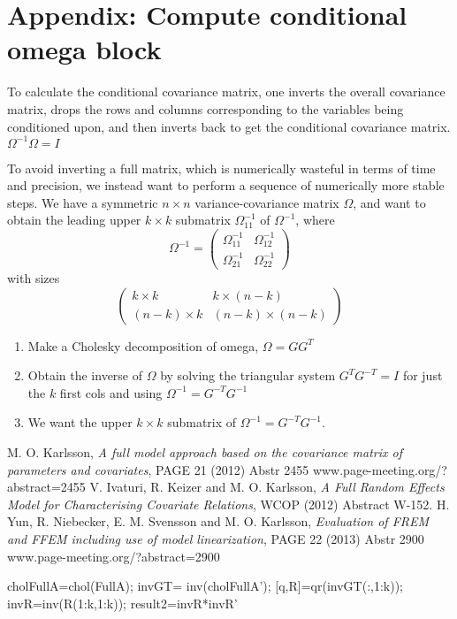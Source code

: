 \section{Appendix: Compute conditional omega block}
To calculate the conditional covariance matrix, 
one inverts the overall covariance matrix, 
drops the rows and columns corresponding to the variables being conditioned upon, and then inverts back to get the conditional covariance matrix.
\begin{math}
\Omega^{-1}\Omega = I
\end{math}

To avoid inverting a full matrix, which is numerically wasteful in terms of time and precision, we instead want to perform a sequence of numerically more stable steps.
We have a symmetric $n\times n$ variance-covariance matrix $\Omega$, and want to obtain the leading upper $k\times k$ submatrix $\Omega^{-1}_{11}$
of $\Omega^{-1}$, where
\[
\Omega^{-1} = \left( \begin{array}{cc}
\Omega^{-1}_{11} & \Omega^{-1}_{12}\\
\Omega^{-1}_{21} & \Omega^{-1}_{22} 
\end{array} \right)
\] with sizes \[
\left(
\begin{array}{cc}
k\times k & k\times (n-k)\\
(n-k)\times k & (n-k)\times (n-k) 
\end{array}
\right)
\] 
\begin{enumerate}
\item Make a Cholesky decomposition of omega, $\Omega=GG^T$
\item Obtain the inverse of $\Omega$ by solving the triangular system $G^{T}G^{-T}=I$ for just the $k$ first cols and using $\Omega^{-1}=G^{-T}G^{-1}$
\item We want the upper $k\times k$ submatrix of $\Omega^{-1}=G^{-T}G^{-1}$.
\end{enumerate}

\begin{thebibliography}{99}
 M. O. Karlsson,
{\em A full model approach based on the covariance matrix of parameters and covariates},
PAGE 21 (2012) Abstr 2455 \mbox{www.page-meeting.org/?abstract=2455} 
V. Ivaturi, R. Keizer and M. O. Karlsson,
{\em A Full Random Effects Model for Characterising Covariate Relations},
WCOP (2012) Abstract W-152.
H. Yun, R. Niebecker, E. M. Svensson and M. O. Karlsson,       
{\em Evaluation of FREM and FFEM including use of model linearization},
PAGE 22 (2013) Abstr 2900 \mbox{www.page-meeting.org/?abstract=2900}    
\end{thebibliography}     
                          


 


  cholFullA=chol(FullA);
invGT=  inv(cholFullA'); %
[q,R]=qr(invGT(:,1:k));
invR=inv(R(1:k,1:k));
result2=invR*invR' 
